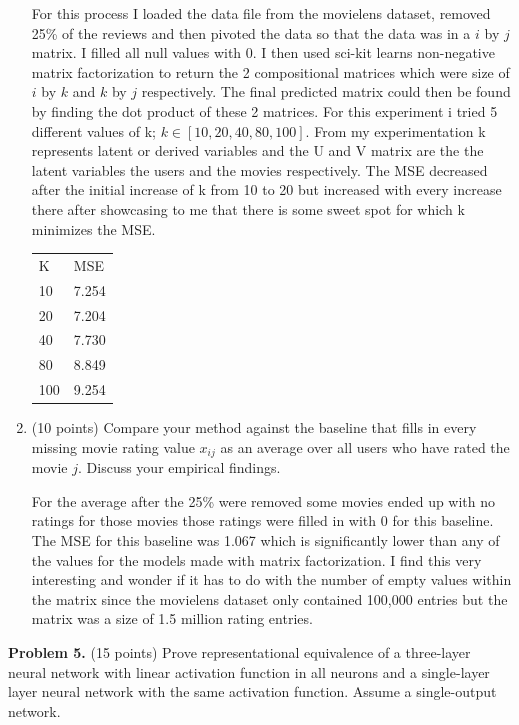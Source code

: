 \documentclass[twoside]{article}
\begin{document}
\begin{enumerate}
For this process I loaded the data file from the movielens dataset, removed 25\% of the reviews and then pivoted the data so that the data was in a $i$ by $j$ matrix. I filled all null values with 0. I then used sci-kit learns non-negative matrix factorization to return the 2 compositional matrices which were size of $i$ by $k$ and $k$ by $j$ respectively. The final predicted matrix could then be found by finding the dot product of these 2 matrices.
For this experiment i tried 5 different values of k; $k \in [10, 20, 40, 80, 100] $. From my experimentation k represents latent or derived variables and the U and V matrix are the the latent variables the users and the movies respectively. The MSE decreased after the initial increase of k from 10 to 20 but increased with every increase there after showcasing to me that there is some sweet spot for which k minimizes the MSE. 
\begin{table}[]
\begin{tabular}{ll}
K   & MSE   \\
10  & 7.254 \\
20  & 7.204 \\
40  & 7.730 \\
80  & 8.849 \\
100 & 9.254
\end{tabular}
\end{table}

\item (10 points) Compare your method against the baseline that fills in every missing movie rating value $x_{ij}$ as an average over all users who have rated the movie $j$. Discuss your empirical findings.

For the average after the 25\% were removed some movies ended up with no ratings for those movies those ratings were filled in with 0 for this baseline. The MSE for this baseline was 1.067 which is significantly lower than any of the values for the models made with matrix factorization. I find this very interesting and wonder if it has to do with the number of empty values within the matrix since the movielens dataset only contained 100,000 entries but the matrix was a size of 1.5 million rating entries. 

\end{enumerate}


\textbf{Problem 5.} (15 points) Prove representational equivalence of a three-layer neural network with linear activation function in all neurons and a single-layer layer neural network with the same activation function. Assume a single-output network.
\end{document}
